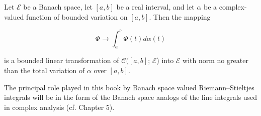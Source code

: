 Let $\mathcal{E}$ be a Banach space, let $[a, b]$ be a real interval, and let $\alpha$ be a complex-valued function of bounded variation on $[a, b]$. Then the mapping

$$\Phi \rightarrow \int_a^b \Phi(t) d\alpha(t)$$

is a bounded linear transformation of $\mathcal{C}([a, b]$; $\mathcal{E}$) into $\mathcal{E}$ with norm no greater than the total variation of $\alpha$ over $[a, b]$.

The principal role played in this book by Banach space valued Riemann–Stieltjes integrals will be in the form of the Banach space analogs of the line integrals used in complex analysis (cf. Chapter 5).
